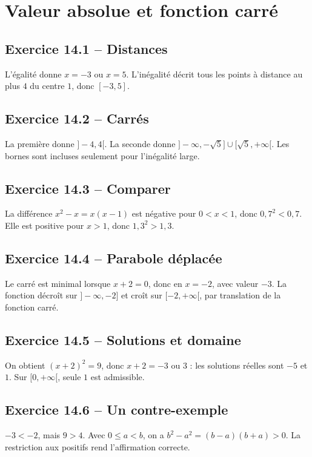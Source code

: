 \chapter{Valeur absolue et fonction carré}
\section*{Exercice 14.1 -- Distances}
L'égalité donne $x=-3$ ou $x=5$. L'inégalité décrit tous les points à distance au plus $4$ du centre $1$, donc $[-3,5]$.

\section*{Exercice 14.2 -- Carrés}
La première donne $]-4,4[$. La seconde donne $]-\infty,-\sqrt5]\cup[\sqrt5,+\infty[$. Les bornes sont incluses seulement pour l'inégalité large.

\section*{Exercice 14.3 -- Comparer}
La différence $x^2-x=x(x-1)$ est négative pour $0<x<1$, donc $0{,}7^2<0{,}7$. Elle est positive pour $x>1$, donc $1{,}3^2>1{,}3$.

\section*{Exercice 14.4 -- Parabole déplacée}
Le carré est minimal lorsque $x+2=0$, donc en $x=-2$, avec valeur $-3$. La fonction décroît sur $]-\infty,-2]$ et croît sur $[-2,+\infty[$, par translation de la fonction carré.

\section*{Exercice 14.5 -- Solutions et domaine}
On obtient $(x+2)^2=9$, donc $x+2=-3$ ou $3$ : les solutions réelles sont $-5$ et $1$. Sur $[0,+\infty[$, seule $1$ est admissible.

\section*{Exercice 14.6 -- Un contre-exemple}
$-3<-2$, mais $9>4$. Avec $0\leq a<b$, on a $b^2-a^2=(b-a)(b+a)>0$. La restriction aux positifs rend l'affirmation correcte.
